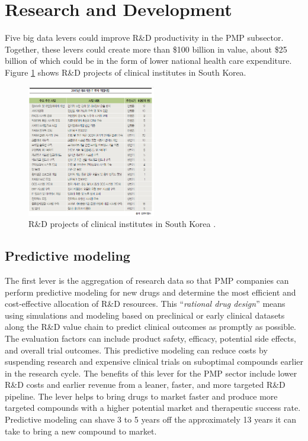\documentclass[twocolumn]{article}
\begin{document}
\section{Research and Development}
Five big data levers could improve R\&D productivity in the PMP subsector. 
Together, these levers could create more than \$100 billion in value, about \$25 billion of which could be in the form of lower national health care expenditure. Figure \ref{fig:rnd-korea} shows R\&D projects of clinical institutes in South Korea.

\begin{figure}[htb]
        \centering
        \includegraphics[width=0.5\textwidth]{rnd-korea.png}
        \caption{R\&D projects of clinical institutes in South Korea \cite{Hong:2015}.}
        \label{fig:rnd-korea}
\end{figure}

\subsection{Predictive modeling}
 The first lever is the aggregation of research data so that PMP companies can perform predictive modeling for new drugs and determine the most efficient and cost-effective allocation of R\&D resources. This “\textit{rational drug design}” means using simulations and modeling based on preclinical or early clinical datasets along the R\&D value chain to predict clinical outcomes as promptly as possible. The evaluation factors can include product safety, efficacy, potential side effects, and overall trial outcomes. This predictive modeling can reduce costs by suspending research and expensive clinical trials on suboptimal compounds earlier in the research cycle.
The benefits of this lever for the PMP sector include lower R\&D costs and earlier revenue from a leaner, faster, and more targeted R\&D pipeline. The lever helps to bring drugs to market faster and produce more targeted compounds with a higher potential market and therapeutic success rate. Predictive modeling can shave 3 to 5 years off the approximately 13 years it can take to bring a new compound to market.
\end{document}
